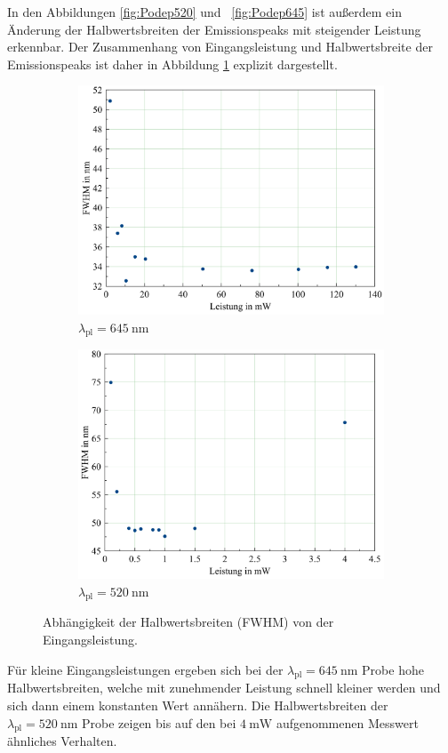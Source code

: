 In den Abbildungen \ref{fig:Podep520} und ~\ref{fig:Podep645} ist außerdem ein Änderung der Halbwertsbreiten der Emissionspeaks mit steigender Leistung erkennbar. Der Zusammenhang von Eingangsleistung und Halbwertsbreite der Emissionspeaks ist daher in Abbildung \ref{fig:FWHM} explizit dargestellt.

\begin{figure}[H]
  \centering
    \begin{subfigure}{0.49\textwidth}
      \includegraphics[width=\textwidth]{plots/FWHMplot_645.png}
      \caption{$\lambda_{\text{pl}} = \SI{645}{\nano\meter}$}
    \end{subfigure}
    \begin{subfigure}{0.49\textwidth}
      \includegraphics[width=\textwidth]{plots/FWHMplot_520.png}
      \caption{$\lambda_{\text{pl}} = \SI{520}{\nano\meter}$}
    \end{subfigure}
  \caption{Abhängigkeit der Halbwertsbreiten (FWHM) von der Eingangsleistung.}
  \label{fig:FWHM}
\end{figure}
Für kleine Eingangsleistungen ergeben sich bei der $\lambda_{\text{pl}}=\SI{645}{\nano\meter}$ Probe hohe Halbwertsbreiten, welche mit zunehmender Leistung schnell kleiner werden und sich dann einem konstanten Wert annähern. Die Halbwertsbreiten der $\lambda_{\text{pl}}=\SI{520}{\nano\meter}$ Probe zeigen bis auf den bei $\SI{4}{\milli\watt}$ aufgenommenen Messwert ähnliches Verhalten.

